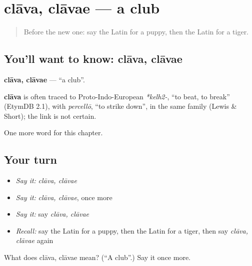 \section[clāva, clāvae]{clāva, clāvae — a club}

\label{lesson:LA-C251-clava}



\begin{quote}
Before the new one: say the Latin for a puppy, then the Latin for a tiger.
\end{quote}

\subsection*{You'll want to know: clāva, clāvae}
\textbf{clāva, clāvae} — \textquotedblleft{}a club\textquotedblright{}.

\begin{cousinweb}
\textbf{clāva} is often traced to Proto-Indo-European \emph{*kelh2-}, \textquotedblleft{}to beat, to break\textquotedblright{} (EtymDB 2.1), with \emph{percellō}, \textquotedblleft{}to strike down\textquotedblright{}, in the same family (Lewis \& Short); the link is not certain.
\end{cousinweb}

\begin{grammarlens}[title={What you've built}]
One more word for this chapter.
\end{grammarlens}

\subsection*{Your turn}
\begin{itemize}
\raggedright
  \item \emph{Say it:} \emph{clāva, clāvae}
  \item \emph{Say it:} \emph{clāva, clāvae}, once more
  \item \emph{Say it:} say \emph{clāva, clāvae}
  \item \emph{Recall:} say the Latin for a puppy, then the Latin for a tiger, then say \emph{clāva, clāvae} again
\end{itemize}

\begin{tcolorbox}[breakable,colback=teal!4,colframe=teal!35!black,title={Before you move on}]
What does clāva, clāvae mean? (\textquotedblleft{}A club\textquotedblright{}.) Say it once more.
\end{tcolorbox}
